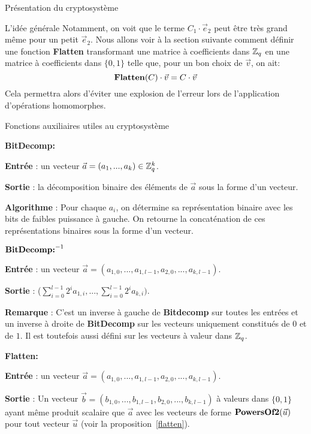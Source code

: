 \begin{section}{Présentation du cryptosystème}
\begin{subsection}{L'idée générale}
	Notamment, on voit que le terme $C_1 \cdot\vec{e}_2$ peut être très grand
	même pour un petit $\vec{e}_2$. Nous allons voir à la section suivante
	comment définir une fonction \textbf{Flatten} transformant une matrice
	à coefficients dans $\mathbb{Z}_q$ en une matrice à coefficients dans $\{0, 1\}$
	telle que, pour un bon choix de $\vec{v}$, on ait:
	\[ \text{\textbf{Flatten}}(C)\cdot\vec{v} = C\cdot\vec{v}\] 
	Cela permettra alors d'éviter une explosion de l'erreur lors de
	l'application d'opérations homomorphes. 
	\end{subsection}
	\begin{subsection}{Fonctions auxiliaires utiles au cryptosystème}

\vspace{0.5cm}\noindent\textbf{BitDecomp:}
\flushleft

	\textbf{Entrée} : un vecteur $\vec{a} = (a_1, ..., a_k) \in \mathbb{Z}_q^{k}$.

	\textbf{Sortie} : la décomposition binaire des éléments de $\vec{a}$ sous la forme d'un vecteur.

	\textbf{Algorithme} : Pour chaque $a_i$, on détermine sa représentation binaire avec les bits de faibles
	puissance à gauche. On retourne la concaténation de ces représentations binaires sous la forme d'un vecteur.
	
\vspace{0.5cm}\noindent$\text{\textbf{BitDecomp:}}^{-1}$
\flushleft

	\textbf{Entrée} : un vecteur $\vec{a} = (a_{1,0}, ..., a_{1,l-1}, a_{2,0}, ..., a_{k,l-1})$.

	\textbf{Sortie} :  ($\sum\limits_{i=0}^{l-1} 2^{i} a_{1,i}, ..., \sum\limits_{i=0}^{l-1} 2^{i} a_{k,i})$.

	\textbf{Remarque} : C'est un inverse à gauche de \textbf{Bitdecomp} sur toutes les entrées et un inverse à droite de
	\textbf{BitDecomp} sur les vecteurs uniquement constitués de $0$ et de $1$. Il est toutefois aussi défini sur
	les vecteurs à valeur dans $\mathbb{Z}_q$.

\vspace{0.5cm}\noindent\textbf{Flatten:}
\flushleft

	\textbf{Entrée} : un vecteur $\vec{a} = (a_{1,0}, ..., a_{1,l-1}, a_{2,0}, ..., a_{k,l-1})$.

	\textbf{Sortie} : Un vecteur $\vec{b} = (b_{1,0}, ..., b_{1,l-1}, b_{2,0}, ..., b_{k,l-1})$ à valeurs dans 
	$\{0,1\}$ ayant même produit scalaire que $\vec{a}$ avec les vecteurs de forme
	$\text{\textbf{PowersOf2}}(\vec{u})$ pour tout vecteur $\vec{u}$ (voir la proposition~\ref{flatten}).


\end{subsection}
\end{section}
